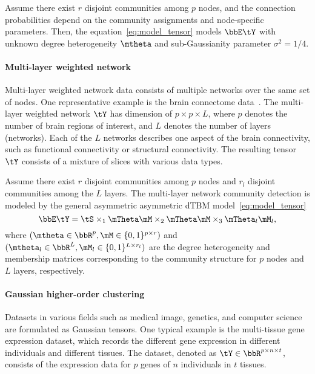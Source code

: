 \documentclass[lettersize,onecolumn,journal]{IEEEtran}
\theoremstyle{definition}
\theoremstyle{definition}
\begin{document}
Assume there exist $r$ disjoint communities among $p$ nodes, and the connection probabilities depend on the community assignments and node-specific parameters. 
Then, the equation~\eqref{eq:model_tensor} models $\bbE \tY$ with unknown degree heterogeneity $\mtheta$ and sub-Gaussianity parameter $\sigma^2 = 1/4$.  

\vspace{0.2cm}
\paragraph{Multi-layer weighted network} 
Multi-layer weighted network data consists of multiple networks over the same set of nodes. One representative example is the brain connectome data~\citep{zhang2019tensor}. The multi-layer weighted network $\tY$ has dimension of $p \times p \times L$, where $p$ denotes the number of brain regions of interest, and $L$ denotes the number of layers (networks). Each of the $L$ networks describes one aspect of the brain connectivity, such as functional connectivity or structural connectivity. The resulting tensor $\tY$ consists of a mixture of slices with various data types. 


Assume there exist $r$ disjoint communities among $p$ nodes and $r_l$ disjoint communities among the $L$ layers. The multi-layer network community detection is modeled by the general asymmetric asymmetric dTBM model~\eqref{eq:model_tensor}
\begin{equation}
    \bbE \tY = \tS \times_1 \mTheta \mM \times_2 \mTheta \mM \times_3 \mTheta_l \mM_l, 
\end{equation}
where $(\mtheta \in \bbR^p, \mM \in \{0,1\}^{p \times r})$ and $ (\mtheta_l \in \bbR^L, \mM_l \in \{0,1\}^{L \times r_l})$ are the degree heterogeneity and membership matrices corresponding to the community structure for $p$ nodes and $L$ layers, respectively. 
\vspace{0.2cm}

\paragraph{Gaussian higher-order clustering} Datasets in various fields such as medical image, genetics, and computer science are formulated as Gaussian tensors. One typical example is the multi-tissue gene expression dataset, which records the different gene expression in different individuals and different tissues. The dataset, denoted as $\tY \in \bbR^{p \times n \times t}$, consists of the expression data for $p$ genes of $n$ individuals in $t$ tissues. 
\end{document}
